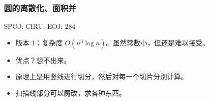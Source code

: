 \documentclass[]{article}
\providecommand{\tightlist}{%
  \setlength{\itemsep}{0pt}\setlength{\parskip}{0pt}}
\begin{document}
\hypertarget{ux5706ux7684ux79bbux6563ux5316ux9762ux79efux5e76}{%
\subsubsection{圆的离散化、面积并}\label{ux5706ux7684ux79bbux6563ux5316ux9762ux79efux5e76}}

SPOJ: CIRU, EOJ: 284

\begin{itemize}
\tightlist
\item
  版本 1：复杂度 \(O(n^3 \log n)\)。虽然常数小，但还是难以接受。
\item
  优点？想不出来。
\item
  原理上是用竖线进行切分，然后对每一个切片分别计算。
\item
  扫描线部分可以魔改，求各种东西。
\end{itemize}
\end{document}
